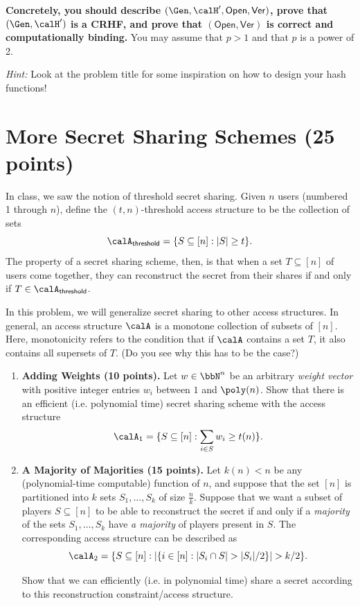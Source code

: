 \documentclass{article}
\newcommand{\Ver}{\mathsf{Ver}}
\newcommand{\Open}{\mathsf{Open}}
\begin{document}
\textbf{Concretely, you should describe $(\Gen, \calH', \Open, \Ver)$, prove that $(\Gen, \calH')$ is a CRHF, and prove that $(\Open, \Ver)$ is correct and computationally binding.} You may assume that $p > 1$ and that $p$ is a power of 2.

\emph{Hint:} Look at the problem title for some inspiration on how to design your hash functions!

\section{More Secret Sharing Schemes (25 points)}
In class, we saw the notion of threshold secret sharing. Given $n$ users (numbered 1 through $n$), define the $(t, n)$-threshold access structure to be the collection of sets 
    \[ \calA_{\mathsf{threshold}} = \{S \subseteq [n] : |S| \geq t \}. \]
The property of a secret sharing scheme, then, is that when a set $T \subseteq [n]$ of users come together, they can reconstruct the secret from their shares if and only if $T \in \calA_{\mathsf{threshold}}$. 

In this problem, we will generalize secret sharing to other access structures. In general, an access structure $\calA$ is a monotone collection of subsets of $[n]$. Here, monotonicity refers to the condition that if $\calA$ contains a set $T$, it also contains all supersets of $T$. (Do you see why this has to be the case?)

\begin{enumerate}
    \item \textbf{Adding Weights (10 points).}  Let $w \in \bbN^n$ be an arbitrary \emph{weight vector} with positive integer entries $w_i$ between $1$ and $\poly(n)$. Show that there is an efficient (i.e. polynomial time) secret sharing scheme with the access structure 
        \[ \calA_1 = \{ S \subseteq [n]: \sum_{i \in S} w_i \geq t(n) \}. \]
    \item \textbf{A Majority of Majorities (15 points).} Let $k(n)<n$ be any (polynomial-time computable) function of $n$, and suppose that the set $[n]$ is partitioned into $k$ sets $S_1, \hdots, S_k$ of size $\frac n k$. Suppose that we want a subset of players $S \subseteq [n]$ to be able to reconstruct the secret if and only if a \emph{majority} of the sets $S_1, \hdots, S_k$ have \emph{a majority} of players present in $S$. The corresponding access structure can be described as
        \[ \calA_2 = \{ S \subseteq [n] : |\{i \in [n]: |S_i \cap S| > |S_i|/2\}| > k/2 \}. \]

    Show that we can efficiently (i.e. in polynomial time) share a secret according to this reconstruction constraint/access structure.
\end{enumerate}
\newpage
\end{document}
